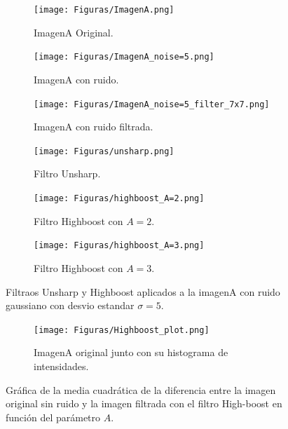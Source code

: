 \documentclass[11pt,twocolumn,twoside]{opticajnl}
\begin{document}
\begin{figure}[h]
    \centering
         \begin{subfigure}[h]{0.32\linewidth}
            \centering
            \texttt{[image: Figuras/ImagenA.png]}
            \caption{ImagenA Original.} 
         \end{subfigure}
         \begin{subfigure}[h]{0.32\linewidth}
            \centering
            \texttt{[image: Figuras/ImagenA\_noise=5.png]}
            \caption{ImagenA con ruido.} 
         \end{subfigure}
         \begin{subfigure}[h]{0.32\linewidth}
            \centering
            \texttt{[image: Figuras/ImagenA\_noise=5\_filter\_7x7.png]}
            \caption{ImagenA con ruido filtrada.} 
         \end{subfigure}
         \begin{subfigure}[h]{0.32\linewidth}
            \centering
            \texttt{[image: Figuras/unsharp.png]}
            \caption{Filtro Unsharp.} 
         \end{subfigure}
         \begin{subfigure}[h]{0.32\linewidth}
            \centering
            \texttt{[image: Figuras/highboost\_A=2.png]}
            \caption{Filtro Highboost con $A=2$.} 
         \end{subfigure}
         \begin{subfigure}[h]{0.32\linewidth}
            \centering
            \texttt{[image: Figuras/highboost\_A=3.png]}
            \caption{Filtro Highboost con $A=3$.} 
         \end{subfigure}
    \caption{Filtraos Unsharp y Highboost aplicados a la imagenA con ruido gaussiano con desvio estandar $\sigma =5$.}
    \label{fig:highunsharp}
\end{figure}

\begin{figure}[h]
    \centering
         \begin{subfigure}[h]{\linewidth}
            \centering
            \texttt{[image: Figuras/Highboost\_plot.png]}
            \caption{ImagenA original junto con su histograma de intensidades.} 
         \end{subfigure}
    \caption{Gráfica de la media cuadrática de la diferencia entre la imagen original sin ruido y la imagen filtrada con el filtro High-boost en función del parámetro $A$.}
    \label{fig:plot_highboost}
\end{figure}
\end{document}
